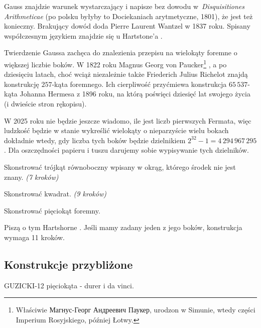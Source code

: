 Gauss znajdzie warunek wystarczający i napisze bez dowodu w~\emph{Disquisitiones Arithmeticae} (po polsku byłyby to Dociekaniach arytmetyczne, 1801), że jest też konieczny.
Brakujący dowód doda Pierre Laurent Wantzel w 1837 roku.
%
Spisany współczesnym językiem znajdzie się u Hartstone'a \cite[s. 258]{hartshorne2000}.

Twierdzenie Gaussa zachęca do znalezienia przepisu na wielokąty foremne o większej liczbie boków.
W 1822 roku Magnus Georg von Paucker\footnote{Właściwie Магнус-Георг Андреевич Паукер, urodzon w Simunie, wtedy części Imperium Rosyjskiego, później Łotwy.} \cite{paucker_1822}, a po dziesięciu latach, choć wciąż niezależnie także Friederich Julius Richelot \cite{richelot_1832} znajdą konstrukcję $257$-kąta foremnego. 
%
%
Ich cierpliwość przyćmiewa konstrukcja $65\,537$-kąta Johanna Hermesa z 1896 roku, na którą poświęci dziesięć lat swojego życia (i dwieście stron rękopisu).

W 2025 roku nie będzie jeszcze wiadomo, ile jest liczb pierwszych Fermata, więc ludzkość będzie w stanie wykreślić wielokąty o nieparzyście wielu bokach dokładnie wtedy, gdy liczba tych boków będzie dzielnikiem $2^{32} - 1 = 4\,294\,967\,295$.
Dla oszczędności papieru i tuszu darujemy sobie wypisywanie tych dzielników.


\begin{problem}
    Skonstrować trójkąt równoboczny wpisany w okrąg, którego środek nie jest znany. \hfill \emph{(7 kroków)}
\end{problem}

\begin{problem}
    Skonstrować kwadrat. \hfill \emph{(9 kroków)}
\end{problem}

\begin{problem}
    Skonstrować pięciokąt foremny.
\end{problem}

Piszą o tym Hartshorne \cite[s. 45-49]{hartshorne2000}.
Jeśli mamy zadany jeden z jego boków, konstrukcja wymaga 11 kroków. %

\subsection{Konstrukcje przybliżone}
GUZICKI-12 pięciokąta - durer i da vinci.

